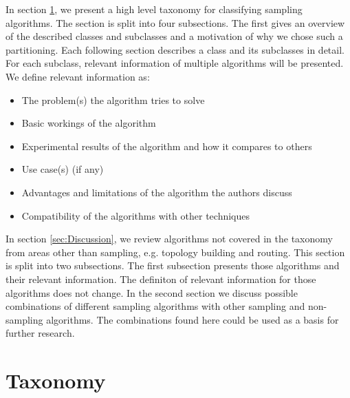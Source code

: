   In section \ref{sec:Taxonomy}, we present a high level taxonomy for classifying sampling algorithms. 
The section is split into four subsections. 
The first gives an overview of the described classes and subclasses and a motivation of why we chose such a partitioning. 
Each following section describes a class and its subclasses in detail. 
For each subclass, relevant information of multiple algorithms will be presented. 
We define relevant information as:
\begin{itemize}
	\item The problem(s) the algorithm tries to solve
	\item Basic workings of the algorithm
	\item Experimental results of the algorithm and how it compares to others
	\item Use case(s) (if any)
	\item Advantages and limitations of the algorithm the authors discuss
	\item Compatibility of the algorithms with other techniques
\end{itemize}   


 In section \ref{sec:Discussion}, we review algorithms not covered in the taxonomy from areas other than sampling, e.g. topology building and routing. 
This section is split into two subsections. 
The first subsection presents those algorithms and their relevant information. 
The definiton of relevant information for those algorithms does not change. 
In the second section we discuss possible combinations of different sampling algorithms with other sampling and non-sampling algorithms. 
The combinations found here could be used as a basis for further research.


\section{Taxonomy}
\label{sec:Taxonomy}

